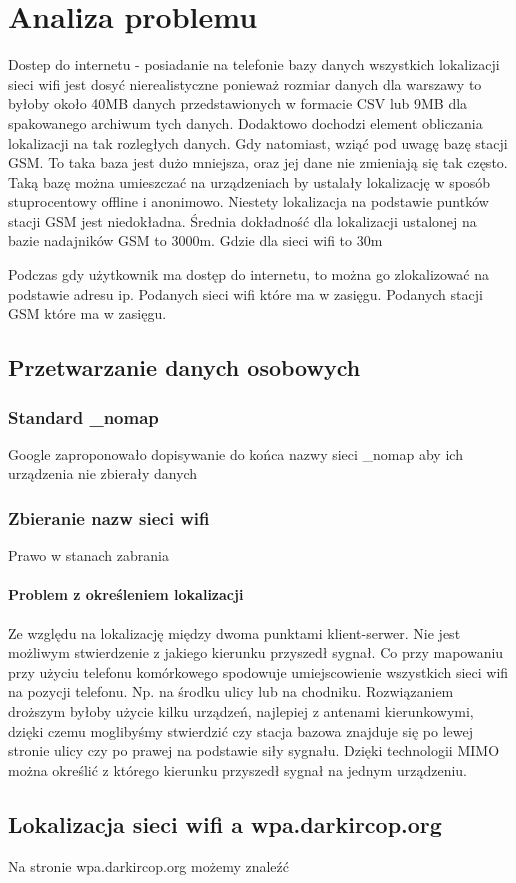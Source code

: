\chapter{Analiza problemu}
Dostep do internetu - posiadanie na telefonie bazy danych wszystkich lokalizacji sieci wifi jest dosyć nierealistyczne ponieważ rozmiar danych dla warszawy to byłoby około 40MB danych przedstawionych w formacie CSV lub 9MB dla spakowanego archiwum tych danych. Dodaktowo dochodzi element obliczania lokalizacji na tak rozległych danych. Gdy natomiast, wziąć pod uwagę bazę stacji GSM. To taka baza jest dużo mniejsza, oraz jej dane nie zmieniają się tak często. Taką bazę można umieszczać na urządzeniach by ustalały lokalizację w sposób stuprocentowy offline i anonimowo. Niestety lokalizacja na podstawie puntków stacji GSM jest niedokładna. Średnia dokładność dla lokalizacji ustalonej na bazie nadajników GSM to 3000m. Gdzie dla sieci wifi to 30m


Podczas gdy użytkownik ma dostęp do internetu, to można go zlokalizować na podstawie adresu ip. Podanych sieci wifi które ma w zasięgu. Podanych stacji GSM które ma w zasięgu.

\section{Przetwarzanie danych osobowych}

\subsection{Standard \_nomap}
Google zaproponowało dopisywanie do końca nazwy sieci _nomap aby ich urządzenia nie zbierały danych
\subsection{Zbieranie nazw sieci wifi}
Prawo w stanach zabrania

\subsubsection{Problem z określeniem lokalizacji}
Ze względu na lokalizację między dwoma punktami klient-serwer. Nie jest możliwym stwierdzenie z jakiego kierunku przyszedł sygnał. Co przy mapowaniu przy użyciu telefonu komórkowego spodowuje umiejscowienie wszystkich sieci wifi na pozycji telefonu. Np. na środku ulicy lub na chodniku.
Rozwiązaniem droższym byłoby użycie kilku urządzeń, najlepiej z antenami kierunkowymi, dzięki czemu moglibyśmy stwierdzić czy stacja bazowa znajduje się po lewej stronie ulicy czy po prawej na podstawie siły sygnału.
Dzięki technologii MIMO można określić z którego kierunku przyszedł sygnał na jednym urządzeniu.

\section{Lokalizacja sieci wifi a wpa.darkircop.org}
Na stronie wpa.darkircop.org możemy znaleźć 

